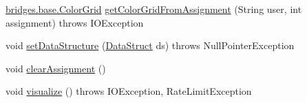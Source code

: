 \begin{DoxyCompactItemize}
\item 
\mbox{\hyperlink{classbridges_1_1base_1_1_color_grid}{bridges.\+base.\+Color\+Grid}} \mbox{\hyperlink{classbridges_1_1connect_1_1_bridges_a83e50f477ac993d2fb8c2449544b6f57}{get\+Color\+Grid\+From\+Assignment}} (String user, int assignment)  throws I\+O\+Exception 
\item 
void \mbox{\hyperlink{classbridges_1_1connect_1_1_bridges_a921a6603b2445b1abe30a1b3d6f0c255}{set\+Data\+Structure}} (\mbox{\hyperlink{classbridges_1_1base_1_1_data_struct}{Data\+Struct}} ds)  throws Null\+Pointer\+Exception 
\item 
void \mbox{\hyperlink{classbridges_1_1connect_1_1_bridges_ad79081ca241e5bcb77b1ed52a09fdd39}{clear\+Assignment}} ()
\item 
void \mbox{\hyperlink{classbridges_1_1connect_1_1_bridges_a1853d64ffb8675ba2ec227a2b819cd24}{visualize}} ()  throws I\+O\+Exception, Rate\+Limit\+Exception 
\end{DoxyCompactItemize}
